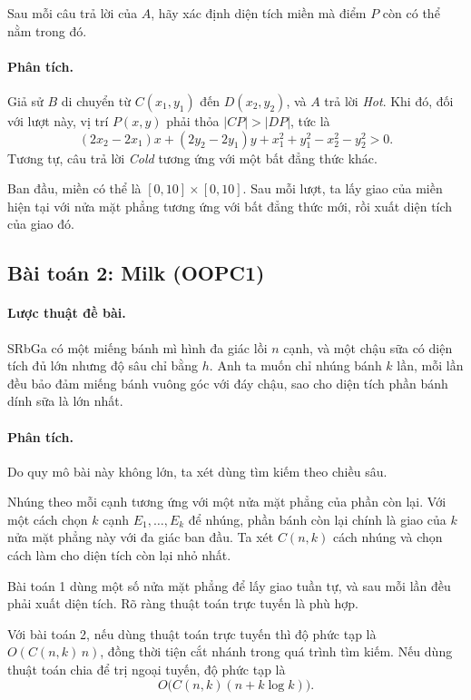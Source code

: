 \documentclass[11pt]{article}
\begin{document}
Sau mỗi câu trả lời của \(A\), hãy xác định diện tích miền mà điểm \(P\) còn
có thể nằm trong đó.

\paragraph{Phân tích.}
Giả sử \(B\) di chuyển từ \(C(x_1,y_1)\) đến \(D(x_2,y_2)\), và \(A\) trả lời
\textit{Hot}. Khi đó, đối với lượt này, vị trí \(P(x,y)\) phải thỏa
\(|CP|>|DP|\), tức là
\[
  (2x_2-2x_1)x+(2y_2-2y_1)y+x_1^2+y_1^2-x_2^2-y_2^2>0.
\]
Tương tự, câu trả lời \textit{Cold} tương ứng với một bất đẳng thức khác.

Ban đầu, miền có thể là \([0,10]\times[0,10]\). Sau mỗi lượt, ta lấy giao
của miền hiện tại với nửa mặt phẳng tương ứng với bất đẳng thức mới, rồi xuất
diện tích của giao đó.

\subsection{Bài toán 2: Milk (OOPC1)}

\paragraph{Lược thuật đề bài.}
SRbGa có một miếng bánh mì hình đa giác lồi \(n\) cạnh, và một chậu sữa có
diện tích đủ lớn nhưng độ sâu chỉ bằng \(h\). Anh ta muốn chỉ nhúng bánh
\(k\) lần, mỗi lần đều bảo đảm miếng bánh vuông góc với đáy chậu, sao cho
diện tích phần bánh dính sữa là lớn nhất.

\paragraph{Phân tích.}
Do quy mô bài này không lớn, ta xét dùng tìm kiếm theo chiều sâu.

Nhúng theo mỗi cạnh tương ứng với một nửa mặt phẳng của phần còn lại. Với một
cách chọn \(k\) cạnh \(E_1,\ldots,E_k\) để nhúng, phần bánh còn lại chính là
giao của \(k\) nửa mặt phẳng này với đa giác ban đầu. Ta xét \(C(n,k)\) cách
nhúng và chọn cách làm cho diện tích còn lại nhỏ nhất.

Bài toán 1 dùng một số nửa mặt phẳng để lấy giao tuần tự, và sau mỗi lần đều
phải xuất diện tích. Rõ ràng thuật toán trực tuyến là phù hợp.

Với bài toán 2, nếu dùng thuật toán trực tuyến thì độ phức tạp là
\(O(C(n,k)\,n)\), đồng thời tiện cắt nhánh trong quá trình tìm kiếm. Nếu dùng
thuật toán chia để trị ngoại tuyến, độ phức tạp là
\[
  O\bigl(C(n,k)(n+k\log k)\bigr).
\]
\end{document}
